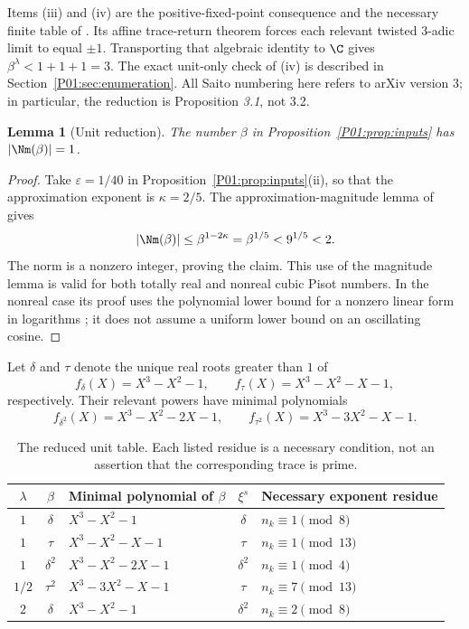 \documentclass[11pt,a4paper]{article}
\newtheorem{lemma}[theorem]{Lemma}\newtheorem{proposition}[theorem]{Proposition}
\theoremstyle{definition}\newtheorem{definition}[theorem]{Definition}
\theoremstyle{remark}\newtheorem{remark}[theorem]{Remark}
\begin{document}
Items (iii) and (iv) are the positive-fixed-point consequence and the
necessary finite table of \cite{K064}. Its affine trace-return theorem
forces each relevant twisted $3$-adic limit to equal $\pm1$.
Transporting that algebraic identity to $\C$ gives
$\beta^\lambda<1+1+1=3$. The exact unit-only check of (iv) is
described in Section~\ref{P01:sec:enumeration}.
All Saito numbering here refers to arXiv version 3; in particular,
the reduction is Proposition \emph{3.1}, not 3.2.

\begin{lemma}[Unit reduction]\label{P01:lem:unit}
The number $\beta$ in Proposition~\ref{P01:prop:inputs} has
$|\Nm(\beta)|=1$.
\end{lemma}
\begin{proof}
Take $\varepsilon=1/40$ in Proposition~\ref{P01:prop:inputs}(ii), so that
the approximation exponent is $\kappa=2/5$.
The approximation-magnitude lemma of \cite{K064} gives
\[
 |\Nm(\beta)|\leq\beta^{1-2\kappa}
       =\beta^{1/5}<9^{1/5}<2.
\]
The norm is a nonzero integer, proving the claim.
This use of the magnitude lemma is valid for both totally real and
nonreal cubic Pisot numbers. In the nonreal case its proof uses the
polynomial lower bound for a nonzero linear form in logarithms
\cite{BW}; it does not assume a uniform lower bound on an oscillating
cosine.
\end{proof}

Let $\delta$ and $\tau$ denote the unique real roots greater than $1$ of
\[
 f_\delta(X)=X^3-X^2-1,
 \qquad f_\tau(X)=X^3-X^2-X-1,
\]
respectively. Their relevant powers have minimal polynomials
\[
 f_{\delta^2}(X)=X^3-X^2-2X-1,
 \qquad f_{\tau^2}(X)=X^3-3X^2-X-1.
\]

\begin{table}[htbp]
\centering
\small
\begin{tabular}{cclcl}
\toprule
$\lambda$ & $\beta$ & Minimal polynomial of $\beta$
 & $\xi^s$ & Necessary exponent residue \\
\midrule
$1$ & $\delta$ & $X^3-X^2-1$ & $\delta$ & $n_k\equiv1\pmod8$\\
$1$ & $\tau$ & $X^3-X^2-X-1$ & $\tau$ & $n_k\equiv1\pmod{13}$\\
$1$ & $\delta^2$ & $X^3-X^2-2X-1$ & $\delta^2$ & $n_k\equiv1\pmod4$\\
$1/2$ & $\tau^2$ & $X^3-3X^2-X-1$ & $\tau$ & $n_k\equiv7\pmod{13}$\\
$2$ & $\delta$ & $X^3-X^2-1$ & $\delta^2$ & $n_k\equiv2\pmod8$\\
\bottomrule
\end{tabular}
\caption{The reduced unit table. Each listed residue is a necessary
condition, not an assertion that the corresponding trace is prime.}
\label{P01:tab:unit}
\end{table}
\end{document}
